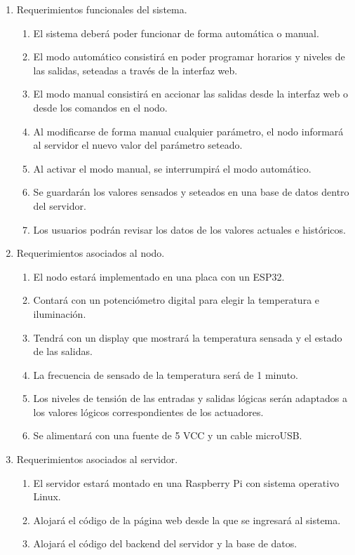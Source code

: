 \documentclass[
11pt, %
]{charter}
\begin{document}
\begin{enumerate}
	\item Requerimientos funcionales del sistema.
		\begin{enumerate}
			\item El sistema deberá poder funcionar de forma automática o manual.
			\item El modo automático consistirá en poder programar horarios y niveles de las salidas, seteadas a través de la interfaz web.
			\item El modo manual consistirá en accionar las salidas desde la interfaz web o desde los comandos en el nodo.
			\item Al modificarse de forma manual cualquier parámetro, el nodo informará al servidor el nuevo valor del parámetro seteado.
			\item Al activar el modo manual, se interrumpirá el modo automático.
			\item Se guardarán los valores sensados y seteados en una base de datos dentro del servidor.
			\item Los usuarios podrán revisar los datos de los valores actuales e históricos.
		\end{enumerate}
	\item Requerimientos asociados al nodo.
		\begin{enumerate}
			\item El nodo estará implementado en una placa con un ESP32.
			\item Contará con un potenciómetro digital para elegir la temperatura e iluminación.
			\item Tendrá con un display que mostrará la temperatura sensada y el estado de las salidas.
			\item La frecuencia de sensado de la temperatura será de 1 minuto.
			\item Los niveles de tensión de las entradas y salidas lógicas serán adaptados a los valores lógicos correspondientes de los actuadores.
			\item Se alimentará con una fuente de 5 VCC y un cable microUSB.
		\end{enumerate}
	\item Requerimientos asociados al servidor.
		\begin{enumerate}
			\item El servidor estará montado en una Raspberry Pi con sistema operativo Linux.
			\item Alojará el código de la página web desde la que se ingresará al sistema.
			\item Alojará el código del backend del servidor y la base de datos.

\end{enumerate}
\end{enumerate}
\end{document}
